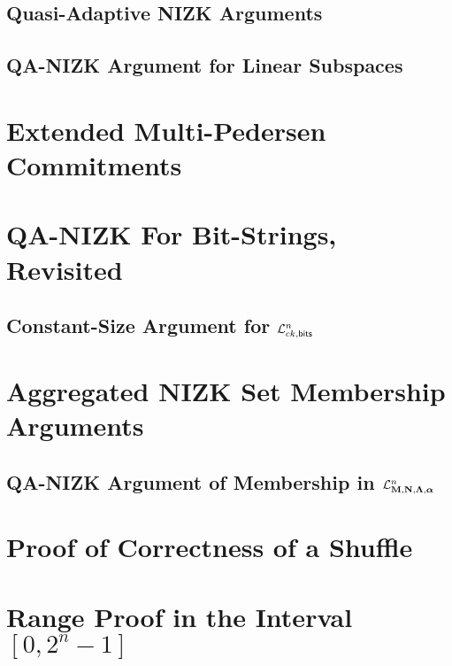 \documentclass[11pt]{llncs}
\begin{document}
    \subsection{Quasi-Adaptive NIZK Arguments} \label{zkdef} \label{sec:zkdef}
        
    \subsection{QA-NIZK Argument for Linear Subspaces} \label{Sect:QANIZKlinspace}
        

\section{Extended Multi-Pedersen Commitments} \label{sec:mp-comm}
    

\section{QA-NIZK For Bit-Strings, Revisited} \label{sec:bits}
      
    \subsection{Constant-Size Argument for $\mathcal{L}_{ck,\mathsf{bits}}^n$} \label{sec:bits-n}
        
       
\section{Aggregated NIZK Set Membership Arguments} \label{sec:bin-lang}
    
    \subsection{QA-NIZK Argument of Membership in $\mathcal{L}_{\mathbf{{M}},\mathbf{{N}},\mathbf{{\Lambda}},{\boldsymbol \alpha}}^n$} \label{sec:bin-lan-constr}
        

\section{Proof of Correctness of a Shuffle} \label{sec:shuffle}

%        
\section{Range Proof in the Interval $[0,2^n-1]$} \label{sec:range-proof}
    
\end{document}
